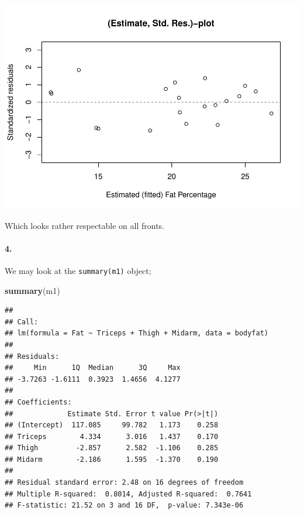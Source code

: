 \documentclass[
]{article}
\newenvironment{Shaded}{\begin{snugshade}}{\end{snugshade}}
\newcommand{\KeywordTok}[1]{\textcolor[rgb]{0.13,0.29,0.53}{\textbf{#1}}}
\newcommand{\NormalTok}[1]{#1}
\begin{document}
\begin{center}\includegraphics{matstatproblems20-21_files/figure-latex/unnamed-chunk-70-1} \end{center}

Which looks rather respectable on all fronts.

\hypertarget{section-66}{%
\paragraph{\texorpdfstring{\textbf{4.}}{4.}}\label{section-66}}

We may look at the \texttt{summary(m1)} object;

\begin{Shaded}
\begin{Highlighting}[]
\KeywordTok{summary}\NormalTok{(m1)}
\end{Highlighting}
\end{Shaded}

\begin{verbatim}
## 
## Call:
## lm(formula = Fat ~ Triceps + Thigh + Midarm, data = bodyfat)
## 
## Residuals:
##     Min      1Q  Median      3Q     Max 
## -3.7263 -1.6111  0.3923  1.4656  4.1277 
## 
## Coefficients:
##             Estimate Std. Error t value Pr(>|t|)
## (Intercept)  117.085     99.782   1.173    0.258
## Triceps        4.334      3.016   1.437    0.170
## Thigh         -2.857      2.582  -1.106    0.285
## Midarm        -2.186      1.595  -1.370    0.190
## 
## Residual standard error: 2.48 on 16 degrees of freedom
## Multiple R-squared:  0.8014, Adjusted R-squared:  0.7641 
## F-statistic: 21.52 on 3 and 16 DF,  p-value: 7.343e-06
\end{verbatim}
\end{document}
